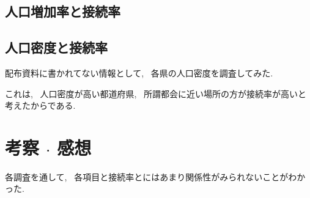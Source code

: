 \documentclass{jsarticle}
\begin{document}
    \subsection{人口増加率と接続率}

    \subsection{人口密度と接続率}
        配布資料に書かれてない情報として,
        ~各県の人口密度を調査してみた.

        これは, ~人口密度が高い都道府県,
        ~所謂都会に近い場所の方が接続率が高いと考えたからである.

\section{考察 $\cdot$ 感想}
    各調査を通して, ~各項目と接続率とにはあまり関係性がみられないことがわかった.


\end{document}

